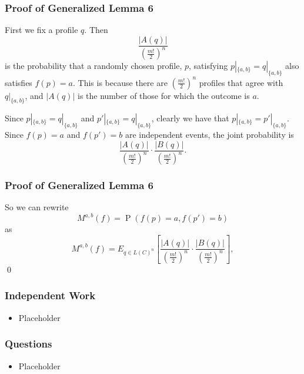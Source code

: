 \documentclass[aspectratio=169]{beamer}
\DeclareMathOperator{\probability}{P}
\begin{document}
		\begin{frame}
			\frametitle{Proof of Generalized Lemma 6}

			First we fix a profile $q$. Then
			\[
				\frac{|A(q)|}{\left(\frac{m!}{2}\right)^n}
			\]
			is the probability that a randomly chosen profile, $p$, satisfying $p|_{\{a,b\}} = q|_{\{a,b\}}$ also satisfies $f(p) = a$. This is because there are $(\frac{m!}{2})^n$ profiles that agree with $q|_{\{a,b\}}$, and $|A(q)|$ is the number of those for which the outcome is $a$.

			Since $p|_{\{a,b\}} = q|_{\{a,b\}}$ and $p'|_{\{a,b\}} = q|_{\{a,b\}}$, clearly we have that $p|_{\{a,b\}} = p'|_{\{a,b\}}$. Since $f(p) = a$ and $f(p') = b$ are independent events, the joint probability is
			\[
				\frac{|A(q)|}{\left(\frac{m!}{2}\right)^n} \cdot \frac{|B(q)|}{\left(\frac{m!}{2}\right)^n}.
			\]
		\end{frame}

		\begin{frame}
			\frametitle{Proof of Generalized Lemma 6}

			So we can rewrite
			\[
				M^{a,b}(f) = \probability(f(p) = a, f(p') = b)
			\]
			as
			\[
				M^{a,b}(f) = E_{q \in L(C)^n} \left[ \frac{|A(q)|}{\left(\frac{m!}{2}\right)^n} \cdot \frac{|B(q)|}{\left(\frac{m!}{2}\right)^n} \right],
			\]
			\qed
		\end{frame}

		\begin{frame}
			\frametitle{Independent Work}
			\begin{itemize}
				\item Placeholder 
			\end{itemize}
		\end{frame}

		\begin{frame}
			\frametitle{Questions}
			\begin{itemize}
				\item Placeholder
			\end{itemize}
		\end{frame}
\end{document}

